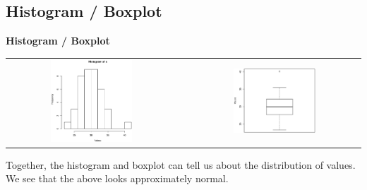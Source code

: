 \documentclass[compress]{beamer}        %
\makeatletter
\newcommand{\tcb}{\textcolor{beamer@blendedblue}}
\makeatother
\begin{document}
\subsection{Histogram / Boxplot}
\begin{frame}{\bf \tcb{Histogram / Boxplot}}\label{histbox}
\begin{adjustwidth}{-0.2cm}{}
\begin{tabular}{c@{}c@{}c}
\includegraphics[width=0.5\textwidth, trim = 0.0cm 0.5cm 0.3cm 0.5cm, clip]{HistNorm}
&&
\includegraphics[width=0.5\textwidth, trim = 0.0cm 0.5cm 0.3cm 0.5cm, clip]{BoxplotNorm}
\end{tabular}
\end{adjustwidth}

Together, the histogram and boxplot can tell us about the distribution of values. We see that the above looks approximately normal.

\end{frame}
\end{document}

